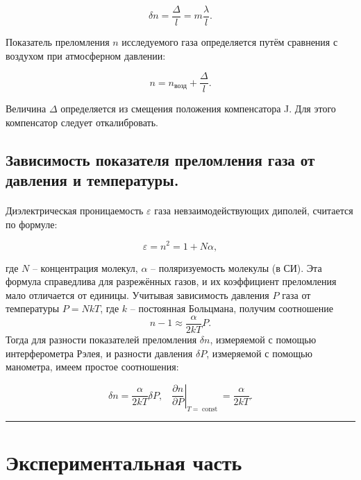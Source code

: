 \documentclass[a4paper,12pt]{article} %
\begin{document}
\begin{equation}
\delta n = \frac{\Delta}{l} = m \frac{\lambda}{l}.
\label{e:deltan}
\end{equation}

Показатель преломления $n$ исследуемого газа определяется путём сравнения с воздухом при атмосферном давлении:

\begin{equation}
n = n_\text{возд} + \frac{\Delta}{l}.
\label{e:air}
\end{equation}

Величина $\Delta$ определяется из смещения положения компенсатора J. Для этого компенсатор следует откалибровать.

\subsection{Зависимость показателя преломления газа от давления и температуры.}

\paragraph{} Диэлектрическая проницаемость $\varepsilon$ газа невзаимодействующих диполей, считается по формуле:

\begin{equation}
\varepsilon = n^2 = 1 + N\alpha,
\label{e:eps}
\end{equation}

\noindent где $N$ -- концентрация молекул, $\alpha$ -- поляризуемость молекулы (в СИ). Эта формула справедлива для разрежённых газов, и их коэффициент преломления мало отличается от единицы. Учитывая зависимость давления $P$ газа от температуры $P = NkT$, где $k$ -- постоянная Больцмана, получим соотношение
\[
n - 1 \approx \frac{\alpha}{2kT}P.
\]
\noindent Тогда для разности показателей преломления $\delta n$, измеряемой с помощью интерферометра Рэлея, и разности давления $\delta P$, измеряемой с помощью манометра, имеем простое соотношения:

\begin{equation}
\delta n = \frac{\alpha}{2kT}\delta P, \;\;\; \left. \frac{\partial n}{\partial P} \right|_{T = \operatorname{const}} = \frac{\alpha}{2kT}.
\label{e:part}
\end{equation}

\medskip\hrule\medskip
\FloatBarrier
\section{Экспериментальная часть}
\end{document}
